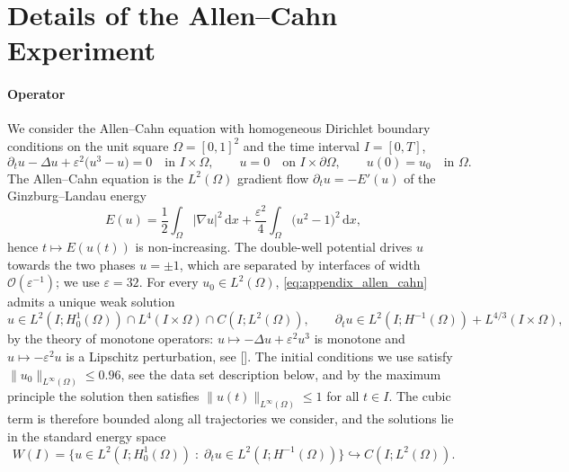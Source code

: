 \documentclass{article} %
\begin{document}
\section{Details of the Allen--Cahn Experiment}\label{appendix:details_allen_cahn}

\paragraph{Operator} We consider the Allen--Cahn equation with homogeneous Dirichlet boundary conditions on the unit square $\Omega = [0,1]^2$ and the time interval $I = [0,T]$,
\begin{equation}\label{eq:appendix_allen_cahn}
   \partial_t u - \Delta u + \varepsilon^2\big(u^3 - u\big) = 0 \quad \text{in } I\times\Omega,
   \qquad
   u = 0 \quad \text{on } I\times\partial\Omega,
   \qquad
   u(0) = u_0 \quad \text{in } \Omega.
\end{equation}
The Allen--Cahn equation is the $L^2(\Omega)$ gradient flow $\partial_t u = -E'(u)$ of the Ginzburg--Landau energy
\begin{equation}\label{eq:appendix_ginzburg_landau}
   E(u) = \frac12\int_\Omega |\nabla u|^2\,\mathrm dx + \frac{\varepsilon^2}{4}\int_\Omega \big(u^2 - 1\big)^2\,\mathrm dx,
\end{equation}
hence $t\mapsto E(u(t))$ is non-increasing. The double-well potential drives $u$ towards the two phases $u = \pm 1$, which are separated by interfaces of width $\mathcal O(\varepsilon^{-1})$; we use $\varepsilon = 32$. For every $u_0\in L^2(\Omega)$, \eqref{eq:appendix_allen_cahn} admits a unique weak solution
\begin{equation*}
   u \in L^2(I;H^1_0(\Omega)) \cap L^4(I\times\Omega) \cap C(I;L^2(\Omega)),
   \qquad
   \partial_t u \in L^2(I;H^{-1}(\Omega)) + L^{4/3}(I\times\Omega),
\end{equation*}
by the theory of monotone operators: $u\mapsto -\Delta u + \varepsilon^2 u^3$ is monotone and $u\mapsto -\varepsilon^2 u$ is a Lipschitz perturbation, see []. The initial conditions we use satisfy $\|u_0\|_{L^\infty(\Omega)} \leq 0.96$, see the data set description below, and by the maximum principle the solution then satisfies $\|u(t)\|_{L^\infty(\Omega)}\leq 1$ for all $t\in I$. The cubic term is therefore bounded along all trajectories we consider, and the solutions lie in the standard energy space
\begin{equation*}
   W(I) = \big\{ u\in L^2(I;H^1_0(\Omega)) \;:\; \partial_t u \in L^2(I;H^{-1}(\Omega)) \big\} \hookrightarrow C(I;L^2(\Omega)).
\end{equation*}
\end{document}
